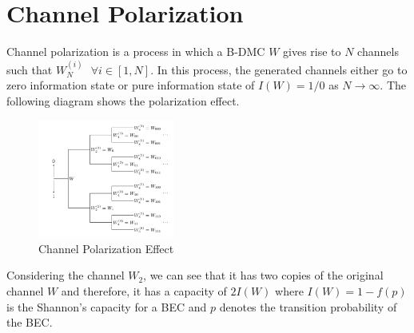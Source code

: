\documentclass{report}
\begin{document}
\section*{Channel Polarization}
Channel polarization is a process in which a B-DMC $W$ gives rise to $N$ channels such that $W_{N}^{(i)} \textrm{ } \forall  i \in [1, N]$. In this process, the generated channels either go to zero information state or pure information state of $I(W) = 1/0$ as $N \rightarrow \infty$. The following diagram shows the polarization effect. 
\begin{figure}[H]
\centering
\includegraphics[width=0.4\textwidth, height=0.2\textheight]{chpol.png}
\caption{Channel Polarization Effect}
\end{figure}
Considering the channel $W_{2}$, we can see that it has two copies of the original channel $W$ and therefore, it has a capacity of $2I(W)$ where $I(W) = 1 - f(p)$ is the Shannon's capacity for a BEC and $p$ denotes the transition probability of the BEC.
\end{document}
